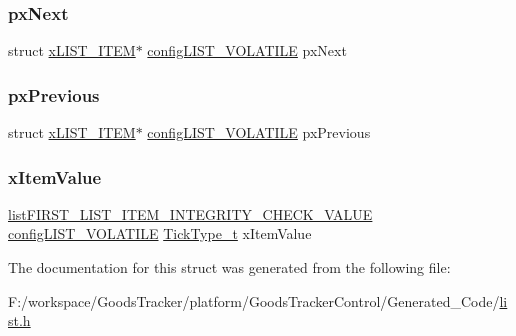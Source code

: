 \subsubsection{\texorpdfstring{px\+Next}{pxNext}}
{\footnotesize\ttfamily struct \hyperlink{structx_l_i_s_t___i_t_e_m}{x\+L\+I\+S\+T\+\_\+\+I\+T\+EM}$\ast$ \hyperlink{list_8h_a2d5de557c5561c8980d1bf51d87d8cba}{config\+L\+I\+S\+T\+\_\+\+V\+O\+L\+A\+T\+I\+LE} px\+Next}

\mbox{\label{structx_m_i_n_i___l_i_s_t___i_t_e_m_a0294e93ecc18bcdb723038af1027505d}} 
\subsubsection{\texorpdfstring{px\+Previous}{pxPrevious}}
{\footnotesize\ttfamily struct \hyperlink{structx_l_i_s_t___i_t_e_m}{x\+L\+I\+S\+T\+\_\+\+I\+T\+EM}$\ast$ \hyperlink{list_8h_a2d5de557c5561c8980d1bf51d87d8cba}{config\+L\+I\+S\+T\+\_\+\+V\+O\+L\+A\+T\+I\+LE} px\+Previous}

\mbox{\label{structx_m_i_n_i___l_i_s_t___i_t_e_m_aa6f3caf3e73107fb0da6fede4b06f104}} 
\subsubsection{\texorpdfstring{x\+Item\+Value}{xItemValue}}
{\footnotesize\ttfamily \hyperlink{list_8h_a3611bd5d5d87cb26ac1dc7a4852b94a0}{list\+F\+I\+R\+S\+T\+\_\+\+L\+I\+S\+T\+\_\+\+I\+T\+E\+M\+\_\+\+I\+N\+T\+E\+G\+R\+I\+T\+Y\+\_\+\+C\+H\+E\+C\+K\+\_\+\+V\+A\+L\+UE} \hyperlink{list_8h_a2d5de557c5561c8980d1bf51d87d8cba}{config\+L\+I\+S\+T\+\_\+\+V\+O\+L\+A\+T\+I\+LE} \hyperlink{portmacro_8h_aa69c48c6e902ce54f70886e6573c92a9}{Tick\+Type\+\_\+t} x\+Item\+Value}



The documentation for this struct was generated from the following file\+:\begin{DoxyCompactItemize}
\item 
F\+:/workspace/\+Goods\+Tracker/platform/\+Goods\+Tracker\+Control/\+Generated\+\_\+\+Code/\hyperlink{list_8h}{list.\+h}\end{DoxyCompactItemize}
